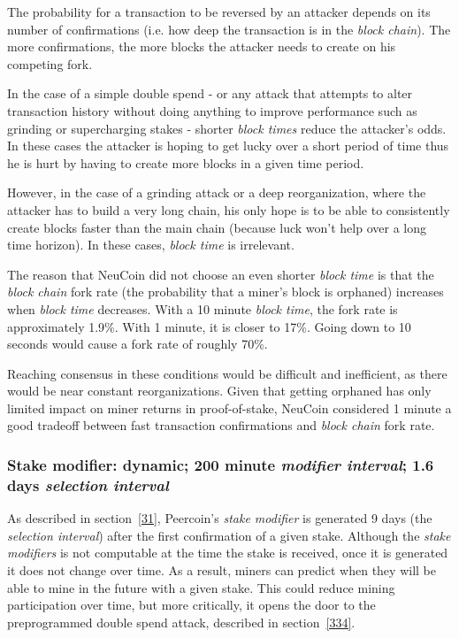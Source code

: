 \documentclass[a4paper,11pt]{article}
\begin{document}
The probability for a transaction to be reversed by an attacker depends on its number of confirmations (i.e. how deep the transaction is in the \textit{block chain}). The more confirmations, the more blocks the attacker needs to create on his competing fork.

In the case of a simple double spend - or any attack that attempts to alter transaction history without doing anything to improve performance such as grinding or supercharging stakes - shorter \textit{block times} reduce the attacker's odds. In these cases the attacker is hoping to get lucky over a short period of time thus he is hurt by having to create more blocks in a given time period.

However, in the case of a grinding attack or a deep reorganization, where the attacker has to build a very long chain, his only hope is to be able to consistently create blocks faster than the main chain (because luck won't help over a long time horizon). In these cases, \textit{block time} is irrelevant.

The reason that NeuCoin did not choose an even shorter \textit{block time} is that the \textit{block chain} fork rate (the probability that a miner's block is orphaned) increases when \textit{block time} decreases. With a 10 minute \textit{block time}, the fork rate is approximately 1.9\%. With 1 minute, it is closer to 17\%. Going down to 10 seconds would cause a fork rate of roughly 70\%\cite{decker2013information}.

Reaching consensus in these conditions would be difficult and inefficient, as there would be near constant reorganizations. Given that getting orphaned has only limited impact on miner returns in proof-of-stake, NeuCoin considered 1 minute a good tradeoff between fast transaction confirmations and \textit{block chain} fork rate.


\subsubsection*{Stake modifier: dynamic; 200 minute \textit{modifier interval}; 1.6 days \textit{selection interval}}


As described in section~\ref{31}, Peercoin's \textit{stake modifier} is generated 9 days (the \textit{selection interval}) after the first confirmation of a given stake. Although the \textit{stake modifiers} is not computable at the time the stake is received, once it is generated it does not change over time. As a result, miners can predict when they will be able to mine in the future with a given stake. This could reduce mining participation over time, but more critically, it opens the door to the preprogrammed double spend attack, described in section~\ref{334}.
\end{document}
